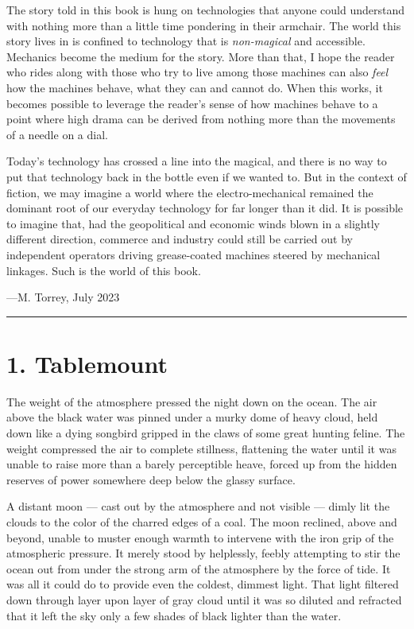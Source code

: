 \documentclass[
]{scrbook}
\begin{document}
The story told in this book is hung on technologies that anyone could
understand with nothing more than a little time pondering in their
armchair. The world this story lives in is confined to technology that
is \emph{non-magical} and accessible. Mechanics become the medium for
the story. More than that, I hope the reader who rides along with those
who try to live among those machines can also \emph{feel} how the
machines behave, what they can and cannot do. When this works, it
becomes possible to leverage the reader's sense of how machines behave
to a point where high drama can be derived from nothing more than the
movements of a needle on a dial.

Today's technology has crossed a line into the magical, and there is no
way to put that technology back in the bottle even if we wanted to. But
in the context of fiction, we may imagine a world where the
electro-mechanical remained the dominant root of our everyday technology
for far longer than it did. It is possible to imagine that, had the
geopolitical and economic winds blown in a slightly different direction,
commerce and industry could still be carried out by independent
operators driving grease-coated machines steered by mechanical linkages.
Such is the world of this book.

---M. Torrey, July 2023

\begin{center}\rule{0.5\linewidth}{0.5pt}\end{center}


\newpage

\hypertarget{tablemount}{%
\section{1. Tablemount}\label{tablemount}}

The weight of the atmosphere pressed the night down on the ocean. The
air above the black water was pinned under a murky dome of heavy cloud,
held down like a dying songbird gripped in the claws of some great
hunting feline. The weight compressed the air to complete stillness,
flattening the water until it was unable to raise more than a barely
perceptible heave, forced up from the hidden reserves of power somewhere
deep below the glassy surface.

A distant moon --- cast out by the atmosphere and not visible --- dimly
lit the clouds to the color of the charred edges of a coal. The moon
reclined, above and beyond, unable to muster enough warmth to intervene
with the iron grip of the atmospheric pressure. It merely stood by
helplessly, feebly attempting to stir the ocean out from under the
strong arm of the atmosphere by the force of tide. It was all it could
do to provide even the coldest, dimmest light. That light filtered down
through layer upon layer of gray cloud until it was so diluted and
refracted that it left the sky only a few shades of black lighter than
the water.
\end{document}
